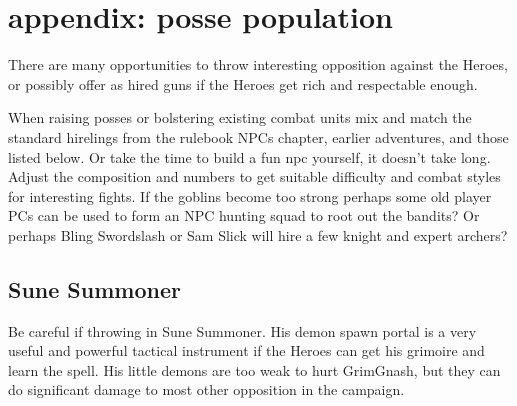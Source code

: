 \clearpage
\section*{appendix: posse population}
\label{appendixpossepopulation}

\raggedbottom

There are many opportunities to throw interesting opposition against the Heroes, or possibly offer as hired guns if the Heroes get rich and respectable enough.

When raising posses or bolstering existing combat units mix and match the standard hirelings from the rulebook NPCs chapter, earlier adventures, and those listed below. Or take the time to build a fun npc yourself, it doesn't take long. Adjust the composition and numbers to get suitable difficulty and combat styles for interesting fights.
If the goblins become too strong perhaps some old player PCs can be used to form an NPC hunting squad to root out the bandits? Or perhaps Bling Swordslash or Sam Slick will hire a few knight and expert archers?


\goodbreak 
\subsection*{Sune Summoner}
\label{sunesummoner}

Be careful if throwing in Sune Summoner. His demon spawn portal is a very useful and powerful tactical instrument if the Heroes can get his grimoire and learn the spell. His little demons are too weak to hurt GrimGnash, but they can do significant damage to most other opposition in the campaign.

\

